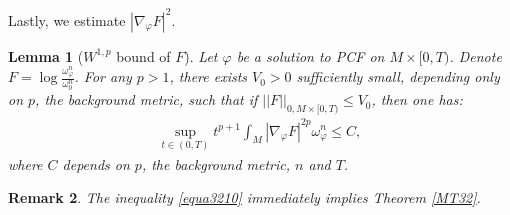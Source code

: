\documentclass[11pt]{amsart}
\newtheorem{lem}{Lemma}[section]
\newtheorem{rem}[lem]{Remark}
\numberwithin{equation}{section}
\begin{document}
\noindent
Lastly, we estimate $|\nabla_\varphi F|^2$. 
 \begin{lem}[$W^{1,p}$ bound of $F$]\label{Lem322}
 	Let $\varphi$ be a solution to PCF on $M\times [0,T)$.  Denote $F=\log\frac{\omega_{\varphi}^n}{\omega_0^n}$.  For any $p>1$,  there exists $V_0>0$ sufficiently small,  depending only on $p$,  the background metric,  such that if $||F||_{0,M\times [0,T)}\le V_0$,  then one has:
	\begin{align}\label{equa3210}
		\sup_{t\in(0,T)}t^{p+1}\int_M|\nabla_{\varphi}F|^{2p}\omega_{\varphi}^n\le C, 
	\end{align}
	where $C$ depends on $p$,  the background metric,  $n$ and $T$.\\
 \end{lem}
 
 \begin{rem}
 	The inequality \eqref{equa3210} immediately implies Theorem \ref{MT32}. \\
 \end{rem}
 
\end{document}
